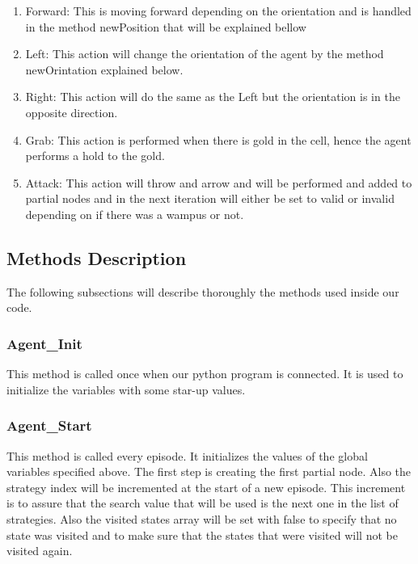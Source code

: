 		\begin{enumerate}
		 \item{Forward: This is moving forward depending on the orientation and is handled in the method newPosition that will be explained bellow}
		 \item{Left: This action will change the orientation of the agent by the method newOrintation explained below.}
		 \item{Right: This action will do the same as the Left but the orientation is in the opposite direction.}
		 \item{Grab: This action is performed when there is gold in the cell, hence the agent performs a hold to the gold.}
		 \item{Attack: This action will throw and arrow and will be performed and added to partial nodes and in the next iteration will either be set to valid or invalid depending on if there was a wampus or not.}
		\end{enumerate}
	
\subsection{Methods Description}
	
	The following subsections will describe thoroughly the methods used inside our code.	
			
		\subsubsection{Agent\_Init}
			This method is called once when our python program is connected. It is used to initialize the variables with some star-up values.		
			
			
		\subsubsection{Agent\_Start}
		This method is called every episode. It initializes the values of the global variables specified above. The first step is creating the first partial node. Also the strategy index will be incremented at the start of a new episode. This increment is to assure that the search value that will be used is the next one in the list of strategies. Also the visited states array will be set with false to specify that no state was visited and to make sure that the states that were visited will not be visited again.
		
